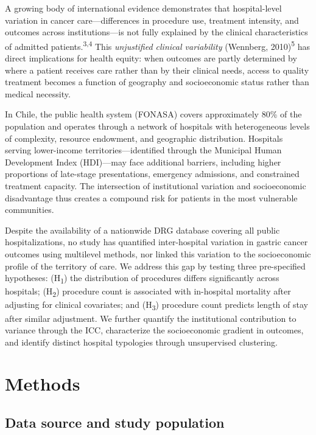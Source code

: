 \documentclass[10pt,twocolumn]{article}
\begin{document}
A growing body of international evidence demonstrates that hospital-level variation in
cancer care—differences in procedure use, treatment intensity, and outcomes across
institutions—is not fully explained by the clinical characteristics of admitted
patients.\textsuperscript{3,4} This \textit{unjustified clinical variability}
(Wennberg, 2010)\textsuperscript{5} has direct implications for health equity: when
outcomes are partly determined by where a patient receives care rather than by their
clinical needs, access to quality treatment becomes a function of geography and
socioeconomic status rather than medical necessity.

In Chile, the public health system (FONASA) covers approximately 80\% of the
population and operates through a network of hospitals with heterogeneous levels of
complexity, resource endowment, and geographic distribution. Hospitals serving
lower-income territories—identified through the Municipal Human Development Index
(HDI)—may face additional barriers, including higher proportions of late-stage
presentations, emergency admissions, and constrained treatment capacity. The
intersection of institutional variation and socioeconomic disadvantage thus creates
a compound risk for patients in the most vulnerable communities.

Despite the availability of a nationwide DRG database covering all public
hospitalizations, no study has quantified inter-hospital variation in gastric cancer
outcomes using multilevel methods, nor linked this variation to the socioeconomic
profile of the territory of care. We address this gap by testing three pre-specified
hypotheses: (H\textsubscript{1}) the distribution of procedures differs significantly
across hospitals; (H\textsubscript{2}) procedure count is associated with in-hospital
mortality after adjusting for clinical covariates; and (H\textsubscript{3}) procedure
count predicts length of stay after similar adjustment. We further quantify the
institutional contribution to variance through the ICC, characterize the
socioeconomic gradient in outcomes, and identify distinct hospital typologies through
unsupervised clustering.

\section{Methods}

\subsection{Data source and study population}
\end{document}
